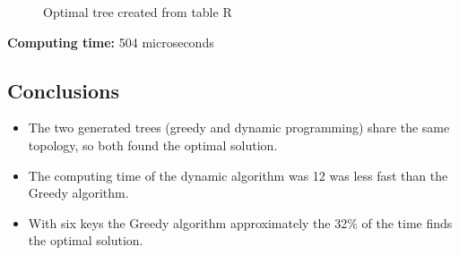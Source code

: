 \documentclass[a4paper,twocolumn,10pt]{article}
\begin{document}
\begin{figure}[H] 
\begin{center} 
Optimal tree created from table R \\ 
{ 
}  
\end{center} 
\end{figure} 

\textbf{Computing time: } 504 microseconds 

\subsection*{Conclusions} 
\begin{itemize}

\item The two generated trees (greedy and dynamic programming) share the same topology, so both found the optimal solution. 
\item The computing time of the dynamic algorithm was 12 was less fast than the Greedy algorithm. 
\item With six keys the Greedy algorithm approximately the 32\% of the time finds the optimal solution. 
\end{itemize}
\end{document}
